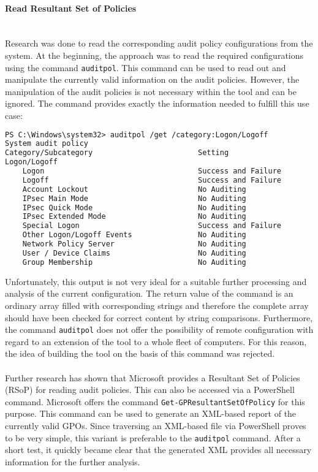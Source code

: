 \paragraph{Read Resultant Set of Policies} \ \\
Research was done to read the corresponding audit policy configurations from the system. At the beginning, the approach was to read the required configurations using the command \lstinline|auditpol|. \cite{auditpol} This command can be used to read out and manipulate the currently valid information on the audit policies. However, the manipulation of the audit policies is not necessary within the tool and can be ignored. The command provides exactly the information needed to fulfill this use case:
\begin{lstlisting}[caption=auditpol, language=html]
PS C:\Windows\system32> auditpol /get /category:Logon/Logoff
System audit policy
Category/Subcategory                        Setting
Logon/Logoff
    Logon                                   Success and Failure
    Logoff                                  Success and Failure
    Account Lockout                         No Auditing
    IPsec Main Mode                         No Auditing
    IPsec Quick Mode                        No Auditing
    IPsec Extended Mode                     No Auditing
    Special Logon                           Success and Failure
    Other Logon/Logoff Events               No Auditing
    Network Policy Server                   No Auditing
    User / Device Claims                    No Auditing
    Group Membership                        No Auditing
\end{lstlisting}
Unfortunately, this output is not very ideal for a suitable further processing and analysis of the current configuration. The return value of the command is an ordinary array filled with corresponding strings and therefore the complete array should have been checked for correct content by string comparisons. Furthermore, the command \lstinline|auditpol| does not offer the possibility of remote configuration with regard to an extension of the tool to a whole fleet of computers. For this reason, the idea of building the tool on the basis of this command was rejected.
\\\\
Further research has shown that Microsoft provides a Resultant Set of Policies (RSoP) \cite{RSoP} for reading audit policies. This can also be accessed via a PowerShell command. Microsoft offers the command \lstinline|Get-GPResultantSetOfPolicy| \cite{GetGPResultantSetOfPolicy} for this purpose. This command can be used to generate an XML-based report of the currently valid GPOs. Since traversing an XML-based file via PowerShell proves to be very simple, this variant is preferable to the \lstinline|auditpol| command. After a short test, it quickly became clear that the generated XML provides all necessary information for the further analysis.


